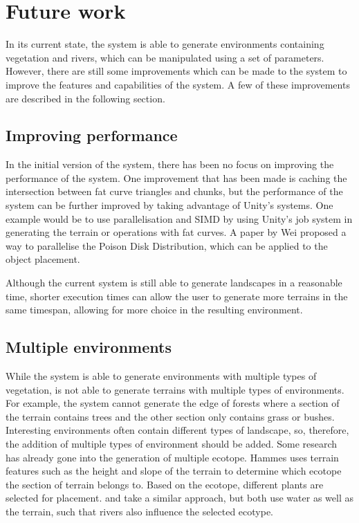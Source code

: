 \section{Future work}
In its current state, the system is able to generate environments containing vegetation and rivers, which can be manipulated using a set of parameters. However, there are still some improvements which can be made to the system to improve the features and capabilities of the system. A few of these improvements are described in the following section.

\subsection{Improving performance}
In the initial version of the system, there has been no focus on improving the performance of the system. One improvement that has been made is caching the intersection between fat curve triangles and chunks, but the performance of the system can be further improved by taking advantage of Unity's systems. One example would be to use parallelisation and SIMD by using Unity's job system in generating the terrain or operations with fat curves. A paper by Wei \cite{wei_parallel_2008} proposed a way to parallelise the Poison Disk Distribution, which can be applied to the object placement.

Although the current system is still able to generate landscapes in a reasonable time, shorter execution times can allow the user to generate more terrains in the same timespan, allowing for more choice in the resulting environment. 

\subsection{Multiple environments}
While the system is able to generate environments with multiple types of vegetation, is not able to generate terrains with multiple types of environments. For example, the system cannot generate the edge of forests where a section of the terrain contains trees and the other section only contains grass or bushes. Interesting environments often contain different types of landscape, so, therefore, the addition of multiple types of environment should be added. Some research has already gone into the generation of multiple ecotope. Hammes \cite{hammes_modeling_2001} uses terrain features such as the height and slope of the terrain to determine which ecotope the section of terrain belongs to. Based on the ecotope, different plants are selected for placement. \cite{do_nascimento_gpu-based_2018}  and \cite{van_muijden_gpu-based_2017} take a similar approach, but both use water as well as the terrain, such that rivers also influence the selected ecotype.


